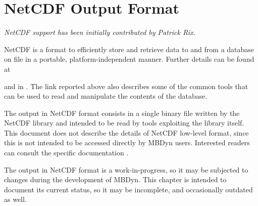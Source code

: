 %
%
%
%
%
% 
%
%

\chapter{NetCDF Output Format}
\label{sec:NETCDF}

\emph{NetCDF support has been initially contributed by Patrick Rix.}

NetCDF is a format to efficiently store and retrieve data to and from
a database on file in a portable, platform-independent manner.
Further details can be found at
\begin{quote}
\end{quote}
and in \cite{NETCDF-UM}.
The link reported above also describes some of the common tools
that can be used to read and manipulate the contents of the database.

The output in NetCDF format consists in a single binary file
written by the NetCDF library and intended to be read by tools
exploiting the library itself.
This document does not describe the details of NetCDF low-level format,
since this is not intended to be accessed directly by MBDyn users.
Interested readers can consult the specific documentation \cite{NETCDF-UM}.

The output in NetCDF format is a work-in-progress, so it may be subjected
to changes during the development of MBDyn.
This chapter is intended to document its current status,
so it may be incomplete, and occasionally outdated as well.



